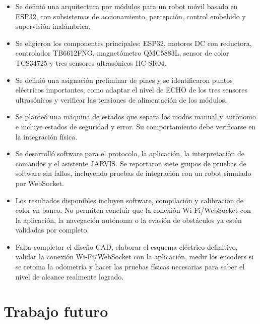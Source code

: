 \documentclass[journal]{IEEEtran}
\begin{document}
\begin{itemize}
    \item Se definió una arquitectura por módulos para un robot móvil basado en ESP32, con subsistemas de accionamiento, percepción, control embebido y supervisión inalámbrica.

    \item Se eligieron los componentes principales: ESP32, motores DC con reductora, controlador TB6612FNG, magnetómetro QMC5883L, sensor de color TCS34725 y tres sensores ultrasónicos HC-SR04.

    \item Se definió una asignación preliminar de pines y se identificaron puntos eléctricos importantes, como adaptar el nivel de ECHO de los tres sensores ultrasónicos y verificar las tensiones de alimentación de los módulos.

    \item Se planteó una máquina de estados que separa los modos manual y autónomo e incluye estados de seguridad y error. Su comportamiento debe verificarse en la integración física.

    \item Se desarrolló software para el protocolo, la aplicación, la interpretación de comandos y el asistente JARVIS. Se reportaron siete grupos de pruebas de software sin fallos, incluyendo pruebas de integración con un robot simulado por WebSocket.

    \item Los resultados disponibles incluyen software, compilación y calibración de color en banco. No permiten concluir que la conexión Wi-Fi/WebSocket con la aplicación, la navegación autónoma o la evasión de obstáculos ya estén validadas por completo.

    \item Falta completar el diseño CAD, elaborar el esquema eléctrico definitivo, validar la conexión Wi-Fi/WebSocket con la aplicación, medir los encoders si se retoma la odometría y hacer las pruebas físicas necesarias para saber el nivel de alcance realmente logrado.
\end{itemize}


\section{Trabajo futuro}
\end{document}
